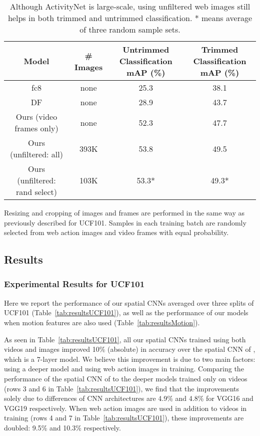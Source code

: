 \documentclass[10pt,twocolumn,letterpaper]{article}
\begin{document}
\begin{table*} [th]
\centering
\caption{Although ActivityNet is large-scale, using unfiltered web images still helps in both trimmed and untrimmed classification. * {\footnotesize means average of three random sample sets.} }
\label{tab:actNet1}
\begin{tabular}{c c c c}
\hline \hline
Model                                   & \# Images & \makecell{Untrimmed Classification \\ mAP (\%)} & \makecell{Trimmed Classification \\ mAP (\%)} \\  \hline 
fc8     \cite{caba2015activitynet}      & none      & 25.3           & 38.1 \\ 
DF \cite{caba2015activitynet}           & none      & 28.9           & 43.7 \\
Ours (video frames only)				& none      & 52.3			 & 47.7 \\
Ours (unfiltered: all)                       & 393K      & 53.8           & 49.5 \\
Ours (unfiltered: rand select)                      & 103K      & { }{ }53.3*       	 & { }{ }49.3* \\
\hline \hline
\end{tabular}
\vspace{-6pt}
\end{table*}


Resizing and cropping of images and frames are performed in the same way as previously described for UCF101. Samples in each training batch are randomly selected from web action images and video frames with equal probability. 

\subsection{Results}
\subsubsection{Experimental Results for UCF101}

Here we report the performance of our spatial CNNs averaged over three splits of UCF101 (Table~\ref{tab:resultsUCF101}), as well as the performance of our models when motion features are also used (Table~\ref{tab:resultsMotion}). 

As seen in Table~\ref{tab:resultsUCF101}, all our spatial CNNs trained using both videos and images improved 10\% (absolute) in accuracy over the spatial CNN of \cite{simonyan2014two}, which is a 7-layer model. We believe this improvement is due to two main factors: using a deeper model and using web action images in training. Comparing the performance of the spatial CNN of \cite{simonyan2014two} to the deeper models trained only on videos (rows 3 and 6 in Table~\ref{tab:resultsUCF101}), we find that the improvements solely due to differences of CNN architectures are 4.9\% and 4.8\% for VGG16 and VGG19 respectively. When web action images are used in addition to videos in training (rows 4 and 7 in Table~\ref{tab:resultsUCF101}), these improvements are doubled: 9.5\% and 10.3\% respectively.
\end{document}
